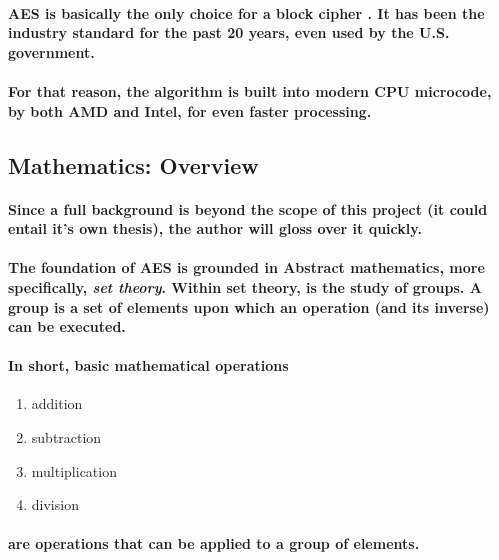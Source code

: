 \paragraph{AES is basically the only choice for a block cipher . It has been the industry standard for the past 20 years, even used by the U.S. government.}\cite{book4}

\paragraph{For that reason, the algorithm is built into modern CPU microcode, by both AMD and Intel, for even faster processing.}



\subsection{Mathematics: Overview}
\paragraph{Since a full background is beyond the scope of this project (it could entail it's own thesis), the author will gloss over it quickly.}

\paragraph{The foundation of AES is grounded in Abstract mathematics, more specifically, \emph{set theory}. Within set theory, is the study of groups. A group is a set of elements upon which an operation (and its inverse) can be executed.}\cite[p. 92]{PaarPelzl} 

\paragraph{In short, basic mathematical operations}

\begin{enumerate}
\item addition
\item subtraction
\item multiplication
\item division
\end{enumerate}

\paragraph{are operations that can be applied to a group of elements.}

